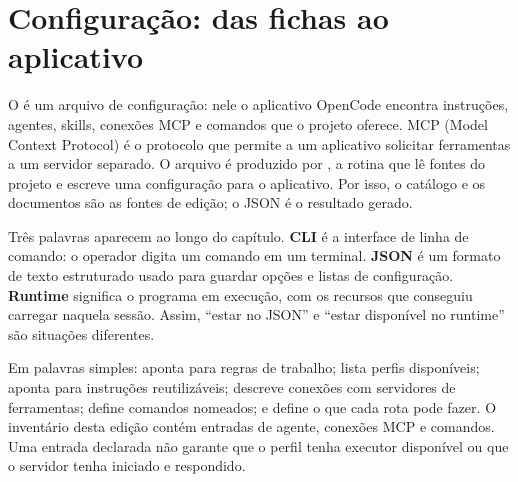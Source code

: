 \section{Configuração: das fichas ao aplicativo}


\begin{descricao}
O  é um arquivo de configuração: nele o aplicativo OpenCode
encontra instruções, agentes, skills, conexões MCP e comandos que o projeto
oferece. MCP (Model Context Protocol) é o protocolo que permite a um aplicativo
solicitar ferramentas a um servidor separado. O arquivo é produzido por
, a rotina que lê fontes do projeto e escreve
uma configuração para o aplicativo. Por isso, o catálogo e os documentos são as
fontes de edição; o JSON é o resultado gerado.
\end{descricao}

\begin{conceito}
Três palavras aparecem ao longo do capítulo. \textbf{CLI} é a interface de
linha de comando: o operador digita um comando em um terminal. \textbf{JSON} é
um formato de texto estruturado usado para guardar opções e listas de
configuração. \textbf{Runtime} significa o programa em execução, com os recursos
que conseguiu carregar naquela sessão. Assim, ``estar no JSON'' e ``estar
disponível no runtime'' são situações diferentes.
\end{conceito}

\begin{resultado}
Em palavras simples:  aponta para regras de trabalho;
 lista perfis disponíveis;  aponta para instruções
reutilizáveis;  descreve conexões com servidores de ferramentas;
 define comandos nomeados; e  define o que cada
rota pode fazer. O inventário desta edição contém \CoreAgentCount{} entradas
de agente, \CoreMCPCount{} conexões MCP e \CoreCommandCount{} comandos.
Uma entrada declarada não garante que o perfil tenha executor disponível ou
que o servidor tenha iniciado e respondido.
\end{resultado}

